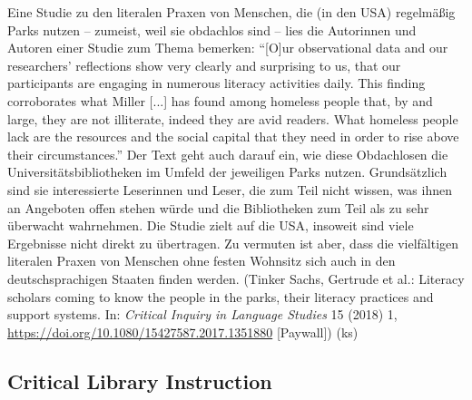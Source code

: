 \documentclass[a4paper,
fontsize=11pt,
oneside,
numbers=noperiodatend,
parskip=half-,
bibliography=totoc,
final
]{scrartcl}
\begin{document}
Eine Studie zu den literalen Praxen von Menschen, die (in den USA)
regelmäßig Parks nutzen -- zumeist, weil sie obdachlos sind -- lies die
Autorinnen und Autoren einer Studie zum Thema bemerken:
\enquote{{[}O{]}ur observational data and our researchers' reflections
show very clearly and surprising to us, that our participants are
engaging in numerous literacy activities daily. This finding
corroborates what Miller {[}...{]} has found among homeless people that,
by and large, they are not illiterate, indeed they are avid readers.
What homeless people lack are the resources and the social capital that
they need in order to rise above their circumstances.} Der Text geht
auch darauf ein, wie diese Obdachlosen die Universitätsbibliotheken im
Umfeld der jeweiligen Parks nutzen. Grundsätzlich sind sie interessierte
Leserinnen und Leser, die zum Teil nicht wissen, was ihnen an Angeboten
offen stehen würde und die Bibliotheken zum Teil als zu sehr überwacht
wahrnehmen. Die Studie zielt auf die USA, insoweit sind viele Ergebnisse
nicht direkt zu übertragen. Zu vermuten ist aber, dass die vielfältigen
literalen Praxen von Menschen ohne festen Wohnsitz sich auch in den
deutschsprachigen Staaten finden werden. (Tinker Sachs, Gertrude et al.:
Literacy scholars coming to know the people in the parks, their literacy
practices and support systems. In: \emph{Critical Inquiry in Language
Studies} 15 (2018) 1,
\url{https://doi.org/10.1080/15427587.2017.1351880} {[}Paywall{]}) (ks)

\hypertarget{critical-library-instruction}{%
\subsection{Critical Library
Instruction}\label{critical-library-instruction}}
\end{document}
